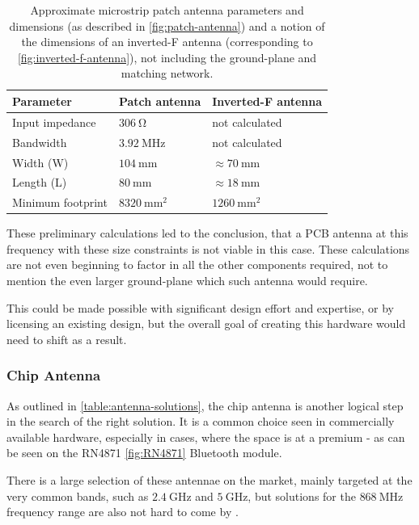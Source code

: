 \begin{table}[H]
\begin{center}
\caption{\label{table:antenna-pcb-calculations}Approximate microstrip patch antenna parameters and dimensions (as described in \ref{fig:patch-antenna}) and a notion of the dimensions of an inverted-F antenna (corresponding to \ref{fig:inverted-f-antenna}), not including the ground-plane and matching network.}
    \begin{tabular}{|l|l|l|} \hline
    \textbf{Parameter}  & \textbf{Patch antenna}    & \textbf{Inverted-F antenna} \\ \hline
    Input impedance     & $306~\mathrm{\Omega}$     & not calculated \\ \hline
    Bandwidth           & $3.92~\mathrm{MHz}$       & not calculated \\ \hline
    Width (W)           & $104~\mathrm{mm}$         & $\approx 70~\mathrm{mm}$ \\ \hline
    Length (L)          & $80~\mathrm{mm}$          & $\approx 18~\mathrm{mm}$ \\ \hline
    Minimum footprint   & $8320~\mathrm{mm^2}$      & $1260~\mathrm{mm^2}$ \\ \hline
    \end{tabular}
\end{center}
\end{table}

These preliminary calculations led to the conclusion, that a PCB antenna at this frequency with these size constraints is not viable in this case. These calculations are not even beginning to factor in all the other components required, not to mention the even larger ground-plane which such antenna would require. 

This could be made possible with significant design effort and expertise, or by licensing an existing design, but the overall goal of creating this hardware would need to shift as a result.

\subsubsection{Chip Antenna}
As outlined in \ref{table:antenna-solutions}, the chip antenna is another logical step in the search of the right solution. It is a common choice seen in commercially available hardware, especially in cases, where the space is at a premium - as can be seen on the RN4871 \ref{fig:RN4871} Bluetooth module.

There is a large selection of these antennae on the market, mainly targeted at the very common bands, such as $2.4~\mathrm{GHz}$ and $5~\mathrm{GHz}$, but solutions for the $868~\mathrm{MHz}$ frequency range are also not hard to come by \cite{digikey_rf_2024,mouser_europe_868_2024}.


